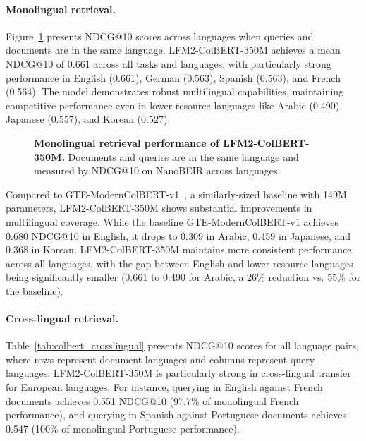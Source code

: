 \documentclass{article}
\begin{document}
\paragraph{Monolingual retrieval.}
Figure~\ref{fig:colbert_monolingual} presents NDCG@10 scores across languages when queries and documents are in the same language. LFM2-ColBERT-350M achieves a mean NDCG@10 of 0.661 across all tasks and languages, with particularly strong performance in English (0.661), German (0.563), Spanish (0.563), and French (0.564). The model demonstrates robust multilingual capabilities, maintaining competitive performance even in lower-resource languages like Arabic (0.490), Japanese (0.557), and Korean (0.527).

\begin{figure}[h]
\centering
{}
\caption{\textbf{Monolingual retrieval performance of LFM2-ColBERT-350M.} Documents and queries are in the same language and measured by NDCG@10 on NanoBEIR across languages.}
\label{fig:colbert_monolingual}
\end{figure}

Compared to GTE-ModernColBERT-v1~\citep{GTE-ModernColBERT}, a similarly-sized baseline with 149M parameters, LFM2-ColBERT-350M shows substantial improvements in multilingual coverage. While the baseline GTE-ModernColBERT-v1 achieves 0.680 NDCG@10 in English, it drops to 0.309 in Arabic, 0.459 in Japanese, and 0.368 in Korean. LFM2-ColBERT-350M maintains more consistent performance across all languages, with the gap between English and lower-resource languages being significantly smaller (0.661 to 0.490 for Arabic, a 26\% reduction vs. 55\% for the baseline).

\paragraph{Cross-lingual retrieval.}
Table~\ref{tab:colbert_crosslingual} presents NDCG@10 scores for all language pairs, where rows represent document languages and columns represent query languages. LFM2-ColBERT-350M is particularly strong in cross-lingual transfer for European languages. For instance, querying in English against French documents achieves 0.551 NDCG@10 (97.7\% of monolingual French performance), and querying in Spanish against Portuguese documents achieves 0.547 (100\% of monolingual Portuguese performance).
\end{document}
